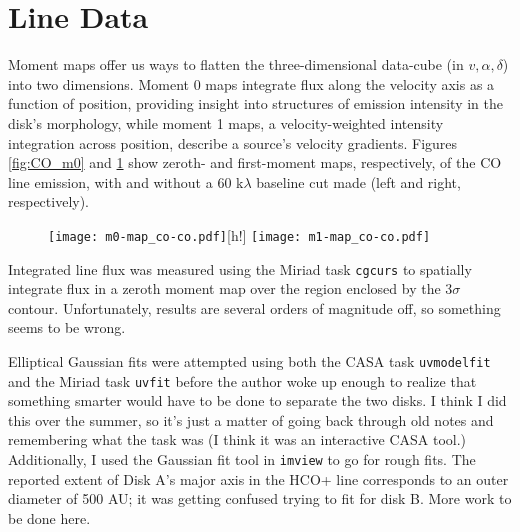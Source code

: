 \section{Line Data}
\label{section:line_data}

Moment maps offer us ways to flatten the three-dimensional data-cube (in $v, \alpha, \delta$) into two dimensions. Moment 0 maps integrate flux along the velocity axis as a function of position, providing insight into structures of emission intensity in the disk's morphology, while moment 1 maps, a velocity-weighted intensity integration across position, describe a source's velocity gradients. Figures \ref{fig:CO_m0} and \ref{fig:CO_m1} show zeroth- and first-moment maps, respectively, of the CO line emission, with and without a 60 k$\lambda$ baseline cut made (left and right, respectively).

\begin{figure}
\centering
\texttt{[image: m0-map\_co-co.pdf]}[h!]
  \label{fig:CO_m0}
  \texttt{[image: m1-map\_co-co.pdf]}
  \label{fig:CO_m1}
\end{figure}



Integrated line flux was measured using the Miriad task \texttt{cgcurs} to spatially integrate flux in a zeroth moment map over the region enclosed by the 3$\sigma$ contour. Unfortunately, results are several orders of magnitude off, so something seems to be wrong.

Elliptical Gaussian fits were attempted using both the CASA task \texttt{uvmodelfit} and the Miriad task \texttt{uvfit} before the author woke up enough to realize that something smarter would have to be done to separate the two disks. I think I did this over the summer, so it's just a matter of going back through old notes and remembering what the task was (I think it was an interactive CASA tool.) Additionally, I used the Gaussian fit tool in \texttt{imview} to go for rough fits. The reported extent of Disk A's major axis in the HCO+ line corresponds to an outer diameter of 500 AU; it was getting confused trying to fit for disk B. More work to be done here.

